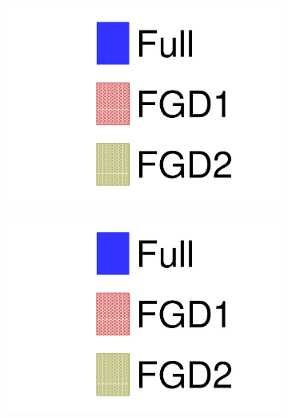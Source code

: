 \begin{figure}[h]
	\begin{subfigure}[t]{0.32\textwidth}
		\includegraphics[width=\textwidth, trim={0mm 0mm 0mm 0mm}, clip, page=1]{figures/mach3/data/alt/try_2017_fit_on_sk_spectra_posterior_sk_error_fgd1only_spectra_posterior_sk_error_fgd2only_spectra}
	\end{subfigure}
	\begin{subfigure}[t]{0.32\textwidth}
		\includegraphics[width=\textwidth, trim={0mm 0mm 0mm 0mm}, clip, page=2]{figures/mach3/data/alt/try_2017_fit_on_sk_spectra_posterior_sk_error_fgd1only_spectra_posterior_sk_error_fgd2only_spectra}
	\end{subfigure}
	\begin{subfigure}[t]{0.32\textwidth}

\end{subfigure}
\end{figure}
